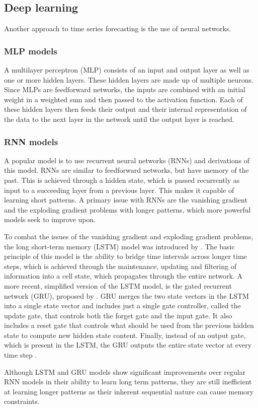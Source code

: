 \subsection{Deep learning}
Another approach to time series forecasting is the use of neural networks.
\subsubsection{MLP models}
A multilayer perceptron (MLP) consists of an input and output layer as well as one or more hidden layers. These hidden layers are made up of multiple neurons. 
Since MLPs are feedforward networks, the inputs are combined with an initial weight in a weighted sum and then passed to the activation function. 
Each of these hidden layers then feeds their output and their internal representation of the data to the next layer in the network until the output layer is reached.\cite{bentoMultilayerPerceptronExplained2021}

\subsubsection{RNN models} \label{subsec:RNNModels}
A popular model is to use recurrent neural networks (RNNs) and derivations of this model. RNNs are similar to feedforward networks, but have memory of the past. 
This is achieved through a hidden state, which is passed recurrently as input to a succeeding layer from a previous layer. This makes it capable of learning short patterns. 
A primary issue with RNNs are the vanishing gradient and the exploding gradient problems with longer patterns, which more powerful models seek to improve upon. \cite{AIModernApproach}\cite{hands-onML}

To combat the issues of the vanishing gradient and exploding gradient problems, the long short-term memory (LSTM) model was introduced by \citet{LSTMPaper}. The basic principle of this model is the ability to bridge time intervals across longer time steps, which is achieved through the maintenance, updating and filtering of information into a cell state, which propagates through the entire network\cite{LSTMPaper}. 
A more recent, simplified version of the LSTM model, is the gated recurrent network (GRU), proposed by \citet{GRU-paper}.
GRU merges the two state vectors in the LSTM into a single state vector and includes just a single gate controller, called the update gate, that controls both the forget gate and the input gate.
It also includes a reset gate that controls what should be used from the previous hidden state to compute new hidden state content.
Finally, instead of an output gate, which is present in the LSTM, the GRU outputs the entire state vector at every time step\cite{RNNPaper} \cite{hands-onML}.

Although LSTM and GRU models show significant improvements over regular RNN models in their ability to learn long term patterns, they are still inefficient at learning longer patterns as their inherent sequential nature can cause memory constraints\cite{AttentionIsAllYouNeed}. 
